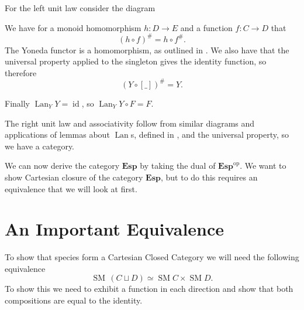 \documentclass[12pt, parskip, DIV=14]{scrbook}
\renewcommand{\circ}{\vysmwhtcircle}
\newcommand{\SM}{\operatorname{SM}}
\newcommand{\Lan}{\operatorname{Lan}}
\newcommand{\Esp}{\mathbf{Esp}}
\newcommand{\op}[1]{#1^\mathrm{op}}
\newcommand{\id}{\operatorname{id}}
\begin{document}
For the left unit law consider the diagram
\begin{center}
\end{center}
We have for a monoid homomorphism $h : D \to E$ and a function $f : C \to D$ that
$$(h \circ f)^\# = h \circ f^\#.$$
The Yoneda functor is a homomorphism, as outlined in . We also have that the universal property applied to the singleton gives the identity function, so therefore
$$(Y \circ [\_])^\# = Y.$$

Finally $\Lan_Y Y = \id$, so $\Lan_Y Y \circ F = F$.

The right unit law and associativity follow from similar diagrams and applications of lemmas about $\Lan$s, defined in , and the universal property, so we have a category.



We can now derive the category $\Esp$ by taking the dual of $\op\Esp$. We want to show Cartesian closure of the category $\Esp$, but to do this requires an equivalence that we will look at first.

\section{An Important Equivalence}

To show that species form a Cartesian Closed Category we will need the following equivalence
\begin{equation}
  \label{eqn:coprodprod}
  \SM\,(C \sqcup D) \simeq \SM C \times \SM D.
\end{equation}
To show this we need to exhibit a function in each direction and show that both compositions are equal to the identity.
\end{document}
